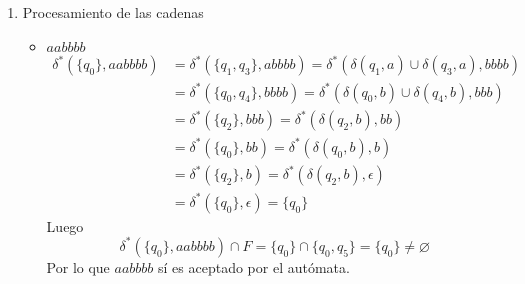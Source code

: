 \documentclass{article}
\begin{document}
\begin{enumerate}
{\begin{itemize}
\begin{enumerate}
{\begin{center}
\begin{figure}[H]
                			\caption{$M$ que reconoce a $L$}
                		\end{figure}
                		\end{center}
                	}
                	\item{
                	 Procesamiento de las cadenas
                	\begin{itemize}
                		\item {
                			$aabbbb$
                			\begin{align*}
                			\delta^{*}(\{q_{0}\}, aabbbb) 
                			&= \delta^{*}(\{q_{1}, q_{3}\}, abbbb) 
                			= \delta^{*}(\delta(q_{1}, a) 
                			\cup \delta(q_{3}, a), bbbb) \\
                			&= \delta^{*}(\{q_{0}, q_{4}\}, bbbb) 
                			= \delta^{*}(\delta(q_{0}, b) 
                			\cup \delta(q_{4}, b), bbb) \\
                			&= \delta^{*}(\{q_{2}\}, bbb) 
                			= \delta^{*}(\delta(q_{2}, b), bb) \\
                			&= \delta^{*}(\{q_{0}\}, bb) 
                			= \delta^{*}(\delta(q_{0}, b), b) \\
                			&= \delta^{*}(\{q_{2}\}, b) 
                			= \delta^{*}(\delta(q_{2}, b), \epsilon) \\
                			&= \delta^{*}(\{q_{0}\}, \epsilon) 
                			=  \{q_{0}\}
                			\end{align*}
                			Luego 
                			\[\delta^{*}(\{q_{0}\}, aabbbb) \cap F = 
                			\{q_{0}\} \cap \{q_{0}, q_{5}\}
                			= \{q_{0}\} \neq \varnothing\]
                			Por lo que $aabbbb$ sí es aceptado por el 
                			autómata.
                		}
                		

\end{itemize}}
\end{enumerate}
\end{itemize}}
\end{enumerate}
\end{document}
